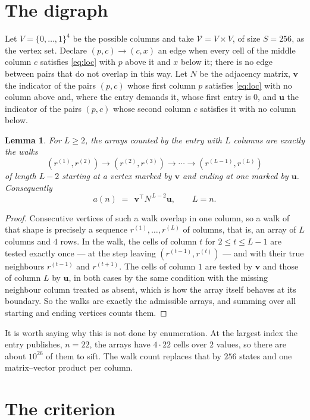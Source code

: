 \documentclass[11pt,a4paper]{article}
\theoremstyle{plain}
\newtheorem{lemma}[theorem]{Lemma}
\theoremstyle{definition}
\begin{document}
\section{The digraph}

Let $V=\{0,\dots,1\}^{4}$ be the possible columns and take
$\mathcal V=V\times V$, of size $S=256$, as the vertex set. Declare $(p,c)\to(c,x)$ an edge
when every cell of the middle column $c$ satisfies \eqref{eq:loc} with $p$ above it and $x$
below it; there is no edge between pairs that do not overlap in this way. Let $N$ be the
adjacency matrix, $\mathbf{v}$ the indicator of the pairs $(p,c)$ whose first column $p$
satisfies \eqref{eq:loc} with no column above and, where the entry demands it, whose first entry is $0$, and $\mathbf{u}$ the indicator of
the pairs $(p,c)$ whose second column $c$ satisfies it with no column below.

\begin{lemma}\label{lem:walk}
For $L\ge2$, the arrays counted by the entry with $L$ columns are exactly the walks
\[
(r^{(1)},r^{(2)})\to(r^{(2)},r^{(3)})\to\cdots\to(r^{(L-1)},r^{(L)})
\]
of length $L-2$ starting at a vertex marked by $\mathbf{v}$ and ending at one marked by
$\mathbf{u}$. Consequently
\[
a(n)\;=\;\,\mathbf{v}^{\!\top}N^{\,L-2}\mathbf{u},\qquad L=n .
\]
\end{lemma}

\begin{proof}
Consecutive vertices of such a walk overlap in one column, so a walk of that shape is
precisely a sequence $r^{(1)},\dots,r^{(L)}$ of columns, that is, an array of $L$ columns
and $4$ rows. In the walk, the cells of column $t$ for $2\le t\le L-1$ are tested
exactly once --- at the step leaving $(r^{(t-1)},r^{(t)})$ --- and with their true
neighbours $r^{(t-1)}$ and $r^{(t+1)}$. The cells of column $1$ are tested by
$\mathbf{v}$ and those of column $L$ by $\mathbf{u}$, in both cases by the same condition
with the missing neighbour column treated as absent, which is how the array itself behaves at
its boundary. So the walks are exactly the admissible arrays, and summing over all starting
and ending vertices counts them.
\end{proof}


It is worth saying why this is not done by enumeration. At the largest index the entry
publishes, $n=22$, the arrays have $4\cdot22$ cells over
$2$ values, so there are about $10^{26}$ of them to sift. The
walk count replaces that by $256$ states and one matrix--vector product per column.
\section{The criterion}
\end{document}
